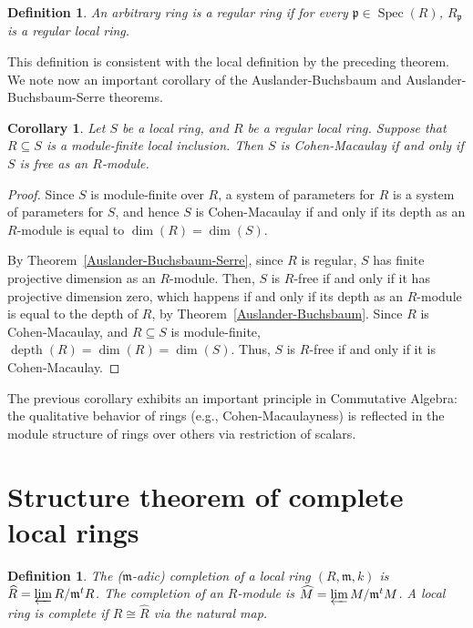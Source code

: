 \documentclass[11pt]{book}
\newtheorem{corollary}[theorem]{Corollary}
\newtheorem{definition}[theorem]{Definition}
\numberwithin{equation}{section}
\numberwithin{theorem}{chapter}
\theoremstyle{definition}
\newtheorem*{basic properties}{Basic Properties}
\newtheorem*{Important Remark}{Important Remark}
\theoremstyle{remark}
\newcommand{\m}{\mathfrak{m}}
\newcommand{\p}{\mathfrak{p}}
\newcommand{\Spec}{\operatorname{Spec}}
\renewcommand{\dim}{\operatorname{dim}}
\newcommand{\depth}{\operatorname{depth}}
\begin{document}
\begin{definition}\label{regular ring}
	An arbitrary ring is a \emph{regular ring} if for every $\p\in \Spec(R)$, $R_{\p}$ is a regular local ring.
\end{definition}

This definition is consistent with the local definition by the preceding theorem. We note now an important corollary of the Auslander-Buchsbaum and Auslander-Buchsbaum-Serre theorems. 

\begin{corollary}
	Let $S$ be a local ring, and $R$ be a regular local ring. Suppose that $R\subseteq S$ is a module-finite local inclusion. Then $S$ is Cohen-Macaulay if and only if $S$ is free as an $R$-module.
\end{corollary}
\begin{proof} Since $S$ is module-finite over $R$, a  system of parameters for $R$ is a system of parameters for $S$, and hence $S$ is Cohen-Macaulay if and only if its depth as an $R$-module is equal to $\dim(R)=\dim(S)$.
	
	By Theorem~\ref{Auslander-Buchsbaum-Serre}, since $R$ is regular, $S$ has finite projective dimension as an $R$-module. Then, $S$ is $R$-free if and only if it has projective dimension zero, which happens if and only if its depth as an $R$-module is equal to the depth of $R$, by Theorem~\ref{Auslander-Buchsbaum}. Since $R$ is Cohen-Macaulay, and $R\subseteq S$ is module-finite, $\depth(R)=\dim(R)=\dim(S)$. Thus, $S$ is $R$-free if and only if it is Cohen-Macaulay.
\end{proof}

The previous corollary exhibits an important principle in Commutative Algebra: the qualitative behavior of rings (e.g., Cohen-Macaulayness) is reflected in the module structure of rings over others via restriction of scalars.

\section{Structure theorem of complete local rings}

\begin{definition}
	The ($\m$-adic) completion of a local ring $(R,\m,k)$ is $\widehat{R}=\varprojlim R/\m^t R$. The completion of an $R$-module is $\widehat{M}=\varprojlim M/\m^t M$. A local ring is complete if $R\cong \widehat{R}$ via the natural map.
\end{definition}
\end{document}
